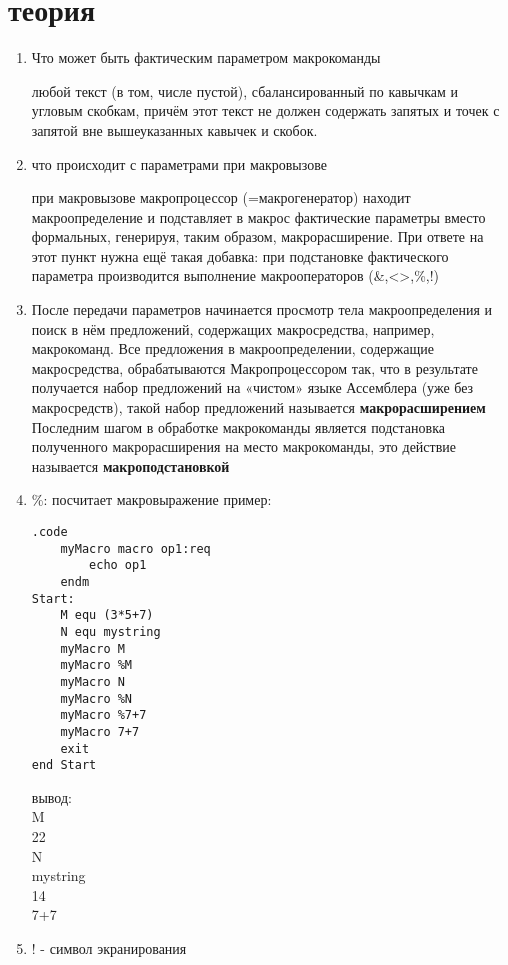 \documentclass[a4paper,10pt]{article}
\begin{document}
\section*{теория}
\begin{enumerate}
    \item Что может быть фактическим параметром макрокоманды \par
    любой текст (в том, числе пустой), сбалансированный по кавычкам и угловым скобкам, причём
    этот текст не должен содержать запятых и точек с запятой вне вышеуказанных кавычек и скобок.
    \item что происходит с параметрами при макровызове \par
    при макровызове макропроцессор (=макрогенератор) находит макроопределение и подставляет в
    макрос фактические параметры вместо формальных, генерируя, таким образом, макрорасширение.
    При ответе на этот пункт нужна ещё такая добавка: при подстановке фактического параметра
    производится выполнение макрооператоров (\&,<>,\%,!)
    \item После передачи параметров начинается просмотр тела макроопределения и поиск в нём предложений, содержащих макросредства, например, макрокоманд. Все предложения в макроопределении,
    содержащие макросредства, обрабатываются Макропроцессором так, что в результате получается
    набор предложений на «чистом» языке Ассемблера (уже без макросредств), такой набор предложений называется \textbf{макрорасширением} Последним шагом в обработке макрокоманды
    является подстановка полученного макрорасширения на место макрокоманды, это действие называется \textbf{макроподстановкой} 
    \item \%: посчитает макровыражение пример:
\begin{multicols}{2}
    \begin{verbatim}
.code
    myMacro macro op1:req
        echo op1
    endm
Start:
    M equ (3*5+7)
    N equ mystring
    myMacro M
    myMacro %M
    myMacro N
    myMacro %N
    myMacro %7+7
    myMacro 7+7
    exit
end Start
    \end{verbatim}
    \columnbreak
вывод: \\
M \\
22 \\
N \\
mystring \\
14 \\
7+7 \\
\end{multicols}
\item ! - символ экранирования

\end{enumerate}
\end{document}
